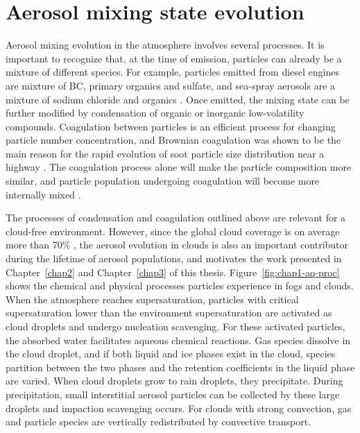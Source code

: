 \documentclass[edeposit,fullpage]{uiucthesis2009}
\newcommand{\jcedits}[1]{{\color{blue} #1}}
\begin{document}
\section{Aerosol mixing state evolution}  
Aerosol mixing evolution in the atmosphere involves several
processes. It is important to recognize that, at the time of emission,
particles can already be a mixture of different species. For example,
particles emitted from diesel engines are mixture of BC, primary
organics and sulfate, and sea-spray aerosols are a mixture of sodium
chloride and organics \citep{cheung2010emissions,
  kirpes2018secondary}. Once emitted, the mixing state can be further
modified by condensation of organic or inorganic low-volatility
compounds.
Coagulation between particles is an efficient process for changing
particle number concentration, and Brownian coagulation was shown to
be the main reason for the rapid evolution of soot particle size
distribution near a highway \citep{jacobson2004evolution}. The
coagulation process alone will make the particle composition more
similar, and particle population undergoing coagulation will become
more internally mixed \citep{Riemer2013a}.

The processes of condensation and coagulation outlined above are
relevant for a cloud-free environment. \jcedits{However,} since the global cloud
coverage is on average more than 70\%
\citep{stubenrauch2013assessment}, the aerosol evolution in clouds is
also an important contributor during the lifetime of aerosol
populations, and motivates the work presented in Chapter~\ref{chap2}
and Chapter~\ref{chap3} of this thesis. Figure~\ref{fig:chap1-aq-proc}
shows the chemical and physical processes particles experience in fogs
and clouds. When the atmosphere reaches supersaturation, particles
with critical supersaturation lower than the environment
supersaturation are activated as cloud droplets and undergo nucleation
scavenging. For these activated particles, the absorbed water
facilitates aqueous chemical reactions. Gas species dissolve in the
cloud droplet, and if both liquid and ice phases exist in the cloud,
species partition between the two phases and the retention
coefficients in the liquid phase are varied. When cloud droplets grow
to rain droplets, they precipitate. During precipitation, small
interstitial aerosol particles can be collected by these large
droplets and impaction scavenging occurs. For clouds with strong
convection, gas and particle species are vertically redistributed by
convective transport.
\end{document}

